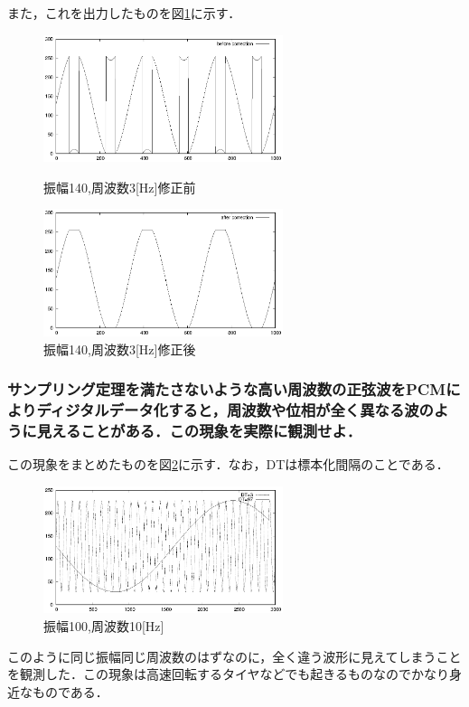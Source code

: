 \documentclass[titlepage]{jarticle}
\begin{document}
また，これを出力したものを図\ref{sin140f3:after}に示す．
\begin{figure}[H]
  \begin{minipage}{0.495\hsize}
    \centering
    \includegraphics[width=7cm]{EPS/sin140f3_before.eps}
    \caption{振幅140,周波数3[Hz]修正前}
    \label{sin140f3:before}
  \end{minipage}
  \begin{minipage}{0.495\hsize}
    \centering
    \includegraphics[width=7cm]{EPS/sin140f3_after.eps}
    \caption{振幅140,周波数3[Hz]修正後}
    \label{sin140f3:after}
  \end{minipage}
\end{figure}
\setcounter{subsubsection}{4}
\subsubsection{サンプリング定理を満たさないような高い周波数の正弦波をPCMによりディジタルデータ化すると，周波数や位相が全く異なる波のように見えることがある．この現象を実際に観測せよ．}

この現象をまとめたものを図\ref{PCM}に示す．なお，DTは標本化間隔のことである．
\begin{figure}[H]
  \centering
  \includegraphics[width=7cm]{EPS/PCM.eps}
  \caption{振幅100,周波数10[Hz]}
  \label{PCM}
\end{figure}
このように同じ振幅同じ周波数のはずなのに，全く違う波形に見えてしまうことを観測した．この現象は高速回転するタイヤなどでも起きるものなのでかなり身近なものである．
\end{document}
